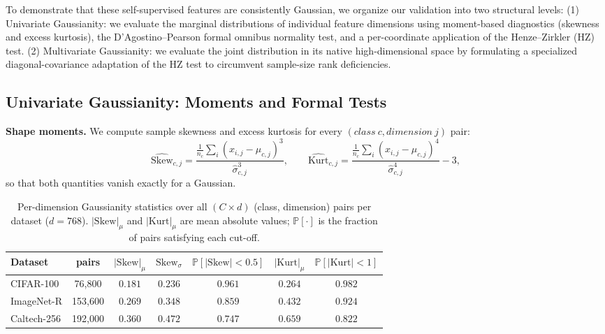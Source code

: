 To demonstrate that these self-supervised features are consistently Gaussian, we organize our validation into two structural levels: (1) Univariate Gaussianity: we evaluate the marginal distributions of individual feature dimensions using moment-based diagnostics (skewness and excess kurtosis), the D'Agostino--Pearson formal omnibus normality test, and a per-coordinate application of the Henze--Zirkler (HZ) test. (2) Multivariate Gaussianity: we evaluate the joint distribution in its native high-dimensional space by formulating a specialized diagonal-covariance adaptation of the HZ test to circumvent sample-size rank deficiencies.

\subsection{Univariate Gaussianity: Moments and Formal Tests}
\label{sec:uv_gaussianity}

\textbf{Shape moments.}
We compute sample skewness and excess kurtosis for every $(class~c, dimension~j)$ pair:
\begin{equation}
    \widehat{\mathrm{Skew}}_{c,j} = \frac{\frac{1}{n_c}\sum_{i}(x_{i,j}-\mu_{c,j})^3}{\hat\sigma_{c,j}^{3}},\qquad
    \widehat{\mathrm{Kurt}}_{c,j} = \frac{\frac{1}{n_c}\sum_{i}(x_{i,j}-\mu_{c,j})^4}{\hat\sigma_{c,j}^{4}} - 3,
    \label{eq:moments_results}
\end{equation}
so that both quantities vanish exactly for a Gaussian.

\begin{table}[htb]
    \centering
    \caption{Per-dimension Gaussianity statistics over all $(C \times d)$ (class, dimension) pairs per dataset ($d=768$). $|\!\mathrm{Skew}|_\mu$ and $|\!\mathrm{Kurt}|_\mu$ are mean absolute values; $\mathbb{P}[\cdot]$ is the fraction of pairs satisfying each cut-off.}
    \label{tab:gaussianity_stats}
    \scriptsize
    \setlength{\tabcolsep}{4pt}
    \begin{tabular}{lcc cc cc}
        \toprule
        \textbf{Dataset} & \textbf{pairs} & $|\!\mathrm{Skew}|_\mu$ & $\mathrm{Skew}_\sigma$ & $\mathbb{P}[|\mathrm{Skew}|{<}0.5]$ & $|\!\mathrm{Kurt}|_\mu$ & $\mathbb{P}[|\mathrm{Kurt}|{<}1]$ \\
        \midrule
        CIFAR-100   & 76,800  & $0.181$ & $0.236$ & $0.961$ & $0.264$ & $0.982$ \\
        ImageNet-R  & 153,600 & $0.269$ & $0.348$ & $0.859$ & $0.432$ & $0.924$ \\
        Caltech-256 & 192,000 & $0.360$ & $0.472$ & $0.747$ & $0.659$ & $0.822$ \\
        \bottomrule
    \end{tabular}
\end{table}

